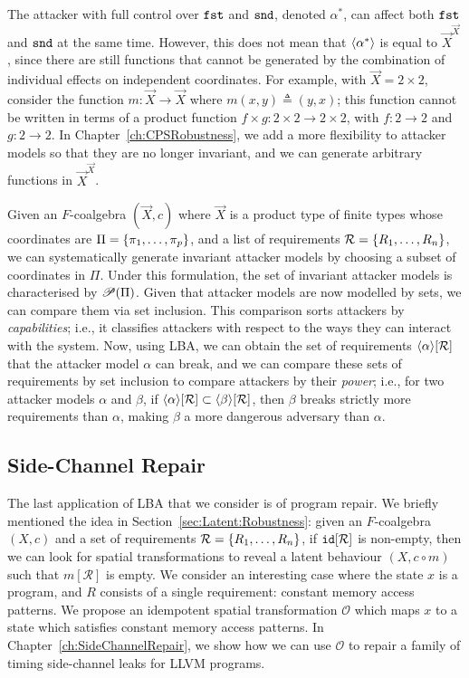 \begin{example}
    The attacker with full control over $\mathtt{\texttt{fst}}$ and $\mathtt{\texttt{snd}}$, denoted $\alpha^*$, can affect both $\mathtt{\texttt{fst}}$ and $\mathtt{\texttt{snd}}$ at the same time. However, this does not mean that ${{\left<\alpha^*\right>}}$ is equal to $\vec{X}^{\vec{X}}$, since there are still functions that cannot be generated by the combination of individual effects on independent coordinates. For example, with $\vec{X}=2\times 2$, consider the function $m\colon \vec{X}\rightarrow \vec{X}$ where $m(x,y)\triangleq(y,x)$; this function cannot be written in terms of a product function $f\times g\colon 2\times 2\rightarrow 2\times 2$, with $f\colon 2\rightarrow 2$ and $g\colon 2\rightarrow 2$.
    In Chapter~\ref{ch:CPSRobustness}, we add a more flexibility to attacker models so that they are no longer invariant, and we can generate arbitrary functions in $\vec{X}^{\vec{X}}$.
\end{example}
Given an $F$-coalgebra $(\vec{X},c)$ where $\vec{X}$ is a product type of finite types whose coordinates are $\Pi=\left\{\pi_1,\ldots,\pi_p\right\}$, and a list of requirements $\mathcal{R}=\left\{R_1, \ldots, R_n\right\}$, we can systematically generate invariant attacker models by choosing a subset of coordinates in $\Pi$. Under this formulation, the set of invariant attacker models is characterised by ${{\mathscr{P}}\!\left({\Pi}\right)}$. Given that attacker models are now modelled by sets, we can compare them via set inclusion. This comparison sorts attackers by \emph{capabilities}; i.e., it classifies attackers with respect to the ways they can interact with the system. Now, using LBA, we can obtain the set of requirements ${{\left<\alpha\right>}}[\mathcal{R}]$ that the attacker model $\alpha$ can break, and we can compare these sets of requirements by set inclusion to compare attackers by their \emph{power}; i.e., for two attacker models $\alpha$ and $\beta$, if ${{\left<\alpha\right>}}[\mathcal{R}]\subset {{\left<\beta\right>}}[\mathcal{R}]$, then $\beta$ breaks strictly more requirements than $\alpha$, making $\beta$ a more dangerous adversary than $\alpha$.%

\subsection{Side-Channel Repair}
The last application of LBA that we consider is of program repair. We briefly mentioned the idea in Section~\ref{sec:Latent:Robustness}: given an $F$-coalgebra $(X,c)$ and a set of requirements $\mathcal{R}=\left\{R_1, \ldots, R_n\right\}$, if ${\texttt{id}}[\mathcal{R}]$ is non-empty, then we can look for spatial transformations to reveal a latent behaviour $(X,c\circ m)$ such that $m[\mathcal{R}]$ is empty. We consider an interesting case where the state $x$ is a program, and $R$ consists of a single requirement: constant memory access patterns. We propose an idempotent spatial transformation $\mathcal{O}$ which maps $x$ to a state which satisfies constant memory access patterns. In Chapter~\ref{ch:SideChannelRepair}, we show how we can use $\mathcal{O}$ to repair a family of timing side-channel leaks for LLVM programs.





